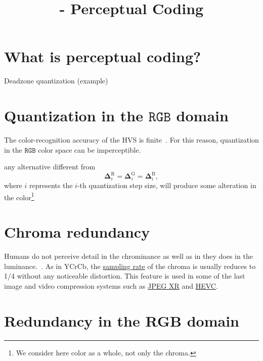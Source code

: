 


\title{\SM{} - Perceptual Coding}

\maketitle

\tableofcontents

\section{What is perceptual coding?}

Deadzone quantization (example)

\section{Quantization in the $\texttt{RGB}$ domain}

The color-recognition accuracy of the HVS is
finite~\cite{vruiz__visual_redundancy}. For this reason, quantization
in the $\texttt{RGB}$ color space can be imperceptible.

any alternative different from
\begin{equation}
  \mathbf{\Delta}^{\text{R}}_i = \mathbf{\Delta}^{\text{G}}_i =
  \mathbf{\Delta}^{\text{B}}_i,
  \label{eq:simple_Q}
\end{equation}
where $i$ represents the $i$-th quantization step size, will produce
some alteration in the color\footnote{We consider here color as a
whole, not only the chroma.}

\section{Chroma redundancy}

Humans do not perceive detail in the chrominance as well as in they
does in the
luminance.~\cite{burger2016digital}. As in
$\text{YCrCb}$, the
\href{https://en.wikipedia.org/wiki/Sampling_(signal_processing)}{sampling
  rate} of the chroma is usually reduces to 1/4 without any noticeable
distortion. This feature is used in some of the last image and video
compression systems such as
\href{https://en.wikipedia.org/wiki/JPEG_XR#Description}{JPEG XR} and
\href{https://en.wikipedia.org/wiki/High_Efficiency_Video_Coding#Video_coding_layer}{HEVC}.

\section{Redundancy in the RGB domain}

